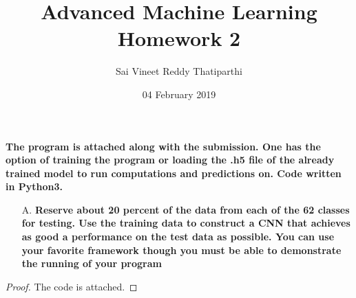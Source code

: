 \documentclass{article}
\date{04 February 2019}
\theoremstyle{case}
\begin{document}
\author{Sai Vineet Reddy Thatiparthi}

 \title{%
  Advanced Machine Learning \\
  \large Homework 2}
\maketitle
\textbf{The program is attached along with the submission. One has the option of training the program or loading the .h5 file of the already trained model to run computations and predictions on. Code written in Python3.}
\begin{enumerate}
    \item [A.] \textbf{Reserve about 20 percent of the data from each of the 62 classes for testing. Use the training data to construct a CNN that achieves as good a performance on the test data as possible. You can use
your favorite framework though you must be able to demonstrate
the running of your program}
\end{enumerate} 
\begin{proof} 
The code is attached.
\end{proof}
\end{document}
